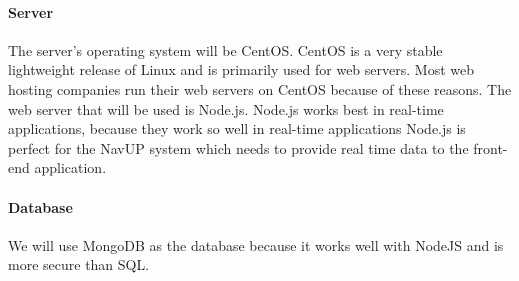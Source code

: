 \documentclass[11pt]{article}
\begin{document}
\paragraph{Server}
The server's operating system will be CentOS. CentOS is a very stable lightweight release of Linux and is primarily used for web servers. Most web hosting companies run their web servers on CentOS because of these reasons. The web server that will be used is Node.js. Node.js works best in real-time applications, because they work so well in real-time applications Node.js is perfect for the NavUP system which needs to provide real time data to the front-end application.
\paragraph{Database}
We will use MongoDB as the database because it works well with NodeJS and is more secure than SQL.
\end{document}
